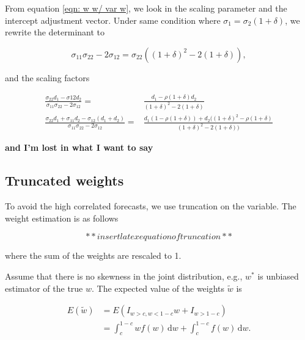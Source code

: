 \documentclass[]{article}
\begin{document}
From equation \ref{eqn: w w/ var w}, we look in the scaling parameter
and the intercept adjustment vector. Under same condition where
\(\sigma_1 =\sigma_2 (1 + \delta)\), we rewrite the determinant to

\begin{equation}
\sigma_{11}\sigma_{22} - 2\sigma_{12} = \sigma_22 ((1+\delta)^2 - 2 (1+\delta)),
\end{equation}

and the scaling factors

\begin{equation}
\label{eqn: scaling factors}
\begin{aligned}
\frac{\sigma_{22} d_1 - \sigma{12}d_2}{\sigma_{11}\sigma_{22} - 2\sigma_{12}} =& \frac{d_1-\rho(1+\delta) d_2}{(1+\delta)^2 - 2 (1+\delta)}\\
\frac{\sigma_{22} d_1 + \sigma_{11} d_2 -\sigma_{12} (d_1 + d_2)}{\sigma_{11}\sigma_{22} - 2\sigma_{12}} =& \frac{d_1(1- \rho(1+\delta)) + d_2 ((1+\delta)^2-\rho(1+\delta)} {(1+\delta)^2 - 2 (1+\delta))}
\end{aligned}
\end{equation}

\textbf{and I'm lost in what I want to say}

\subsection{Truncated weights}\label{truncated-weights}

To avoid the high correlated forecasts, we use truncation on the
variable. The weight estimation is as follows

\begin{equation}
\label{eqn: w trunc}
** insert latex equation of truncation**
\end{equation}

where the sum of the weights are rescaled to 1.

Assume that there is no skewness in the joint distribution, e.g.,
\(w^*\) is unbiased estimator of the true \(w\). The expected value of
the weights \(\tilde{w}\) is

\begin{equation}
\label{eqn: E w trunc}
\begin{aligned}
E(\tilde{w}) &= E(I_{w>c, w<1-c}w + I_{w>1-c})\\
&=\int_c^{1-c} wf(w)\,\mathrm{d}w+\int_c^{1-c} f(w)\,\mathrm{d}w.
\end{aligned}
\end{equation}
\end{document}
